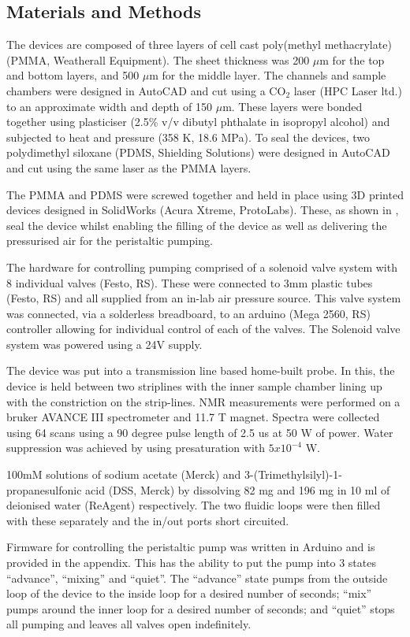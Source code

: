 \subsection{Materials and Methods}

The devices are composed of three layers of cell cast poly(methyl methacrylate) (PMMA,
Weatherall Equipment). The sheet thickness was 200 $\mu$m for the top and bottom layers, and 500 $\mu$m for
the middle layer. The channels and sample chambers were designed in
AutoCAD and cut using a CO$_2$ laser (HPC Laser ltd.) to an approximate width and depth
of 150 $\mu$m. These layers were bonded together using plasticiser (2.5\% v/v dibutyl
phthalate in isopropyl alcohol) and subjected to heat and pressure (358 K, 18.6 MPa).
To seal the devices, two polydimethyl siloxane (PDMS, Shielding Solutions) were
designed in AutoCAD and cut using the same laser as the PMMA layers.

The PMMA and PDMS were screwed together and held in place using 3D printed devices
designed in SolidWorks (Acura Xtreme, ProtoLabs). These, as shown in , seal the
device whilst enabling the filling of the device as well as delivering the pressurised
air for the peristaltic pumping.

The hardware for controlling pumping comprised of a solenoid valve system with 8
individual valves (Festo, RS). These were connected to 3mm plastic tubes (Festo, RS)
and all supplied from an in-lab air pressure source. This valve system was connected,
via a solderless breadboard, to an arduino (Mega 2560, RS) controller allowing for
individual control of each of the valves. The Solenoid valve system was powered using
a 24V supply.

The device was put into a transmission line based home-built probe. In this, the
device is held between two striplines with the inner sample chamber lining up with the
constriction on the strip-lines. NMR measurements were performed on a bruker AVANCE
III spectrometer and 11.7 T magnet. Spectra were collected using 64 scans using a 90
degree pulse length of 2.5 us at 50 W of power. Water suppression was achieved by
using presaturation with $5x10^{-4}$ W.

100mM solutions of sodium acetate (Merck) and 3-(Trimethylsilyl)-1-propanesulfonic
acid (DSS, Merck) by dissolving 82 mg and 196 mg in 10 ml of deionised water
(ReAgent)
respectively. The two fluidic loops were then filled with these separately and the
in/out ports short circuited.

Firmware for controlling the peristaltic pump was written in Arduino and is provided in the appendix.
This has the ability to put the pump into 3 states
“advance”, “mixing” and “quiet”. The “advance” state pumps from the outside loop of
the device to the inside loop for a desired number of seconds; “mix” pumps around the
inner loop for a desired number of seconds; and “quiet” stops all pumping and leaves
all valves open indefinitely.

